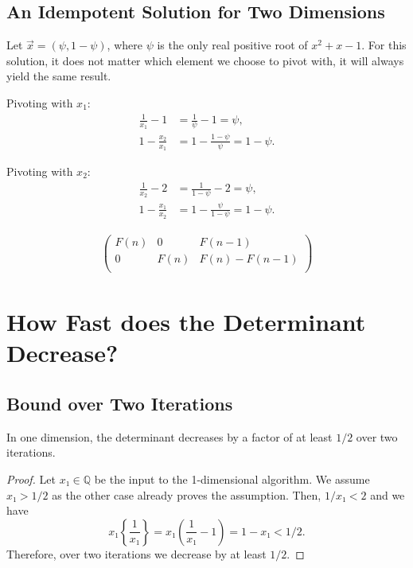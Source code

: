 \documentclass[english,version-2020-11]{uzl-thesis}
\begin{document}
\section{An Idempotent Solution for Two Dimensions}

Let $\vec x = (\psi, 1 - \psi)$, where $\psi$ is the only real positive root of $x^2 + x - 1$.
For this solution, it does not matter which element we choose to pivot with, it will always
yield the same result.

Pivoting with $x_1$:
\begin{align*}
  \frac{1}{x_1} - 1 & = \frac{1}{\psi} - 1 = \psi, \\
  1 - \frac{x_2}{x_1} & = 1 - \frac{1 - \psi}{\psi} = 1 - \psi.
\end{align*}

Pivoting with $x_2$:
\begin{align*}
  \frac{1}{x_2} - 2 & = \frac{1}{1 - \psi} - 2 = \psi, \\
  1 - \frac{x_1}{x_2} & = 1 - \frac{\psi}{1 - \psi} = 1 - \psi.
\end{align*}

\begin{align*}
  \left(
  \begin{array}{cc|c}
    F(n) & 0    & F(n-1) \\
    0    & F(n) & F(n) - F(n-1) \\
  \end{array}
  \right)
\end{align*}


\chapter{How Fast does the Determinant Decrease?}


\section{Bound over Two Iterations}

\begin{proposition}
  In one dimension, the determinant decreases by a factor of at least $1/2$ over
  two iterations.
\end{proposition}

\begin{proof}
  Let $x₁ ∈ ℚ$ be the input to the 1-dimensional algorithm.
  We assume $x₁ > 1/2$ as the other case already proves the assumption.
  Then, $1/x₁ < 2$ and we have
  $$
    x₁ \left\{\frac{1}{x₁}\right\}
    = x₁ \left(\frac{1}{x₁} - 1\right)
    = 1 - x₁ < 1/2.
    $$
  Therefore, over two iterations we decrease by at least $1/2$.
\end{proof}
\end{document}
